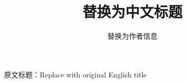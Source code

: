 \documentclass[UTF8,a4paper,11pt]{ctexart}
\title{替换为中文标题}
\author{替换为作者信息}
\date{}
\begin{document}
\maketitle

\begin{center}
{\small 原文标题：Replace with original English title}
\end{center}

\begin{abstract}

\end{abstract}

\tableofcontents
\clearpage



\clearpage

\end{document}
